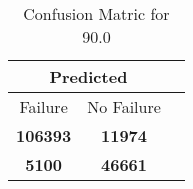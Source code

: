 \begin{table}[] 
\label{Table: Prediction Accuracy-DMD90.0OnlySunEKF-combinationReflection-Reflection} 
\caption{Confusion Matric for 90.0} 
\centering 
\begin{tabular} 
 {@{}ccc@{}} 
\toprule 
\multicolumn{2}{c}{\textbf{Predicted}}
 \\ \midrule 
\multicolumn{1}{|c|}{Failure} & 
\multicolumn{1}{c|}{No Failure}
 \\ \midrule 
\multicolumn{1}{|c|}{\color{green}\textbf{106393}} & 
\multicolumn{1}{c|}{\color{red}\textbf{11974}}
 \\ \midrule 
\multicolumn{1}{|c|}{\color{red}\textbf{5100}} & 
\multicolumn{1}{c|}{\color{green}\textbf{46661}}
 \\ \bottomrule 
\end{tabular} 
\end{table} 
